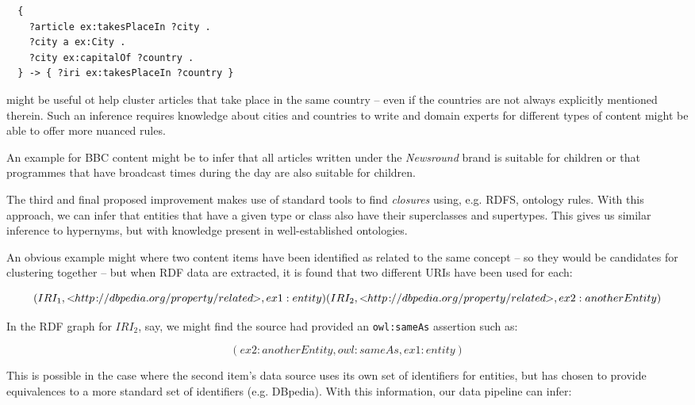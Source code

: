 \documentclass[10pt,a4paper]{report}
\begin{document}
\begin{lstlisting}
  {
    ?article ex:takesPlaceIn ?city .
    ?city a ex:City .
    ?city ex:capitalOf ?country .
  } -> { ?iri ex:takesPlaceIn ?country }
\end{lstlisting}

\noindent might be useful ot help cluster articles that take place in the same
country -- even if the countries are not always explicitly mentioned therein.
Such an inference requires knowledge about cities and countries to
write and domain experts for different types of content might be able to offer
more nuanced rules.

An example for BBC content might be to infer that all articles written under
the \emph{Newsround} brand is suitable for children or that programmes that
have broadcast times during the day are also suitable for children.

The third and final proposed improvement makes use of standard tools to find
\emph{closures} using, e.g. RDFS, ontology rules. With this approach, we
can infer that entities that have a given type or class also have their
superclasses and supertypes. This gives us similar inference to hypernyms,
but with knowledge present in well-established ontologies.

An obvious example might where two content items have been identified as
related to the same concept -- so they would be candidates for clustering
together -- but when RDF data are extracted, it is found that two
different URIs have been used for each:

\begin{displaymath}
(IRI_{1}, <\!\!http\!:\!\!//dbpedia.org/property/related\!\!>, ex1:entity)\\
(IRI_{2}, <\!\!http\!:\!\!//dbpedia.org/property/related\!\!>, ex2:anotherEntity)
\end{displaymath}

In the RDF graph for $IRI_2$, say, we might find the source had provided an
\texttt{owl:sameAs} assertion such as:

\begin{displaymath}
(ex2:anotherEntity, owl:sameAs, ex1:entity)
\end{displaymath}

This is possible in the case where the second item's data source uses its own
set of identifiers for entities, but has chosen to provide equivalences to
a more standard set of identifiers (e.g. DBpedia). With this information,
our data pipeline can infer:
\end{document}
